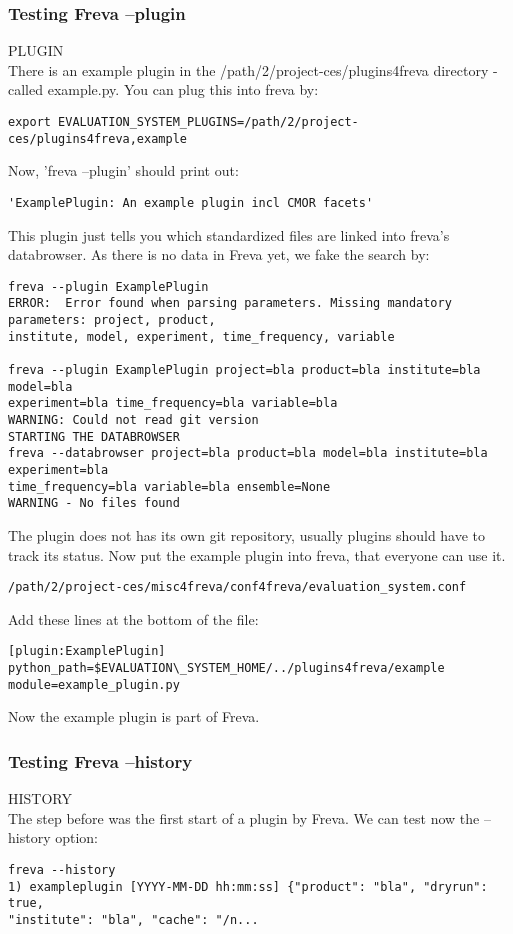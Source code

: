 \documentclass[a4paper,11pt]{ltxdoc}
\begin{document}
\subsubsection{Testing Freva --plugin}
PLUGIN\\
There is an example plugin in the /path/2/project-ces/plugins4freva directory - called example.py. You can plug this into freva by:
\begin{verbatim}export EVALUATION_SYSTEM_PLUGINS=/path/2/project-ces/plugins4freva,example\end{verbatim}
Now, 'freva --plugin' should print out:
\begin{verbatim}'ExamplePlugin: An example plugin incl CMOR facets'\end{verbatim}
This plugin just tells you which standardized files are linked into freva's databrowser. As there is no data in Freva yet, we fake the search by:
\begin{verbatim}
freva --plugin ExamplePlugin
ERROR:  Error found when parsing parameters. Missing mandatory parameters: project, product, 
institute, model, experiment, time_frequency, variable

freva --plugin ExamplePlugin project=bla product=bla institute=bla model=bla 
experiment=bla time_frequency=bla variable=bla
WARNING: Could not read git version
STARTING THE DATABROWSER
freva --databrowser project=bla product=bla model=bla institute=bla experiment=bla 
time_frequency=bla variable=bla ensemble=None
WARNING - No files found
\end{verbatim}
The plugin does not has its own git repository, usually plugins should have to track its status. Now put the example plugin into freva, that everyone can use it.
\begin{verbatim}/path/2/project-ces/misc4freva/conf4freva/evaluation_system.conf \end{verbatim}
Add these lines at the bottom of the file:
\begin{verbatim}[plugin:ExamplePlugin]
python_path=$EVALUATION\_SYSTEM_HOME/../plugins4freva/example
module=example_plugin.py\end{verbatim}
Now the example plugin is part of Freva.
\subsubsection{Testing Freva --history}
HISTORY \\
The step before was the first start of a plugin by Freva. We can test now the --history option:
\begin{verbatim}freva --history
1) exampleplugin [YYYY-MM-DD hh:mm:ss] {"product": "bla", "dryrun": true, 
"institute": "bla", "cache": "/n...\end{verbatim}
\end{document}
